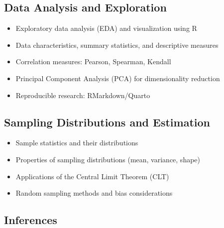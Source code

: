 \documentclass[
  a4paper,
  DIV=11,
  numbers=noendperiod,
  oneside]{scrreprt}
\providecommand{\tightlist}{%
  \setlength{\itemsep}{0pt}\setlength{\parskip}{0pt}}
\theoremstyle{definition}
\theoremstyle{definition}
\theoremstyle{plain}
\theoremstyle{plain}
\theoremstyle{definition}
\theoremstyle{remark}
\begin{document}

\subsection*{Data Analysis and
Exploration}\label{data-analysis-and-exploration}

\begin{itemize}
\tightlist
\item
  Exploratory data analysis (EDA) and visualization using R\\
\item
  Data characteristics, summary statistics, and descriptive measures\\
\item
  Correlation measures: Pearson, Spearman, Kendall\\
\item
  Principal Component Analysis (PCA) for dimensionality reduction\\
\item
  Reproducible research: RMarkdown/Quarto
\end{itemize}

\subsection*{Sampling Distributions and
Estimation}\label{sampling-distributions-and-estimation}

\begin{itemize}
\tightlist
\item
  Sample statistics and their distributions\\
\item
  Properties of sampling distributions (mean, variance, shape)\\
\item
  Applications of the Central Limit Theorem (CLT)\\
\item
  Random sampling methods and bias considerations
\end{itemize}

\subsection*{Inferences}\label{inferences}
\end{document}
